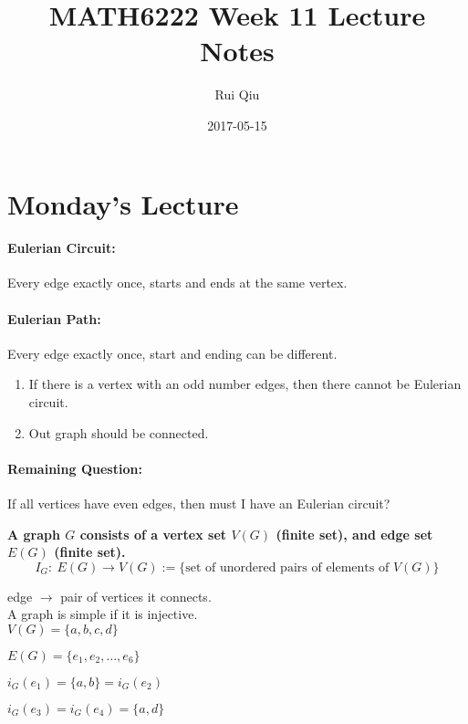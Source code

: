 \documentclass[a4paper, 11pt, twoside]{article}
\begin{document}
\title{MATH6222 Week 11 Lecture Notes}
\author{Rui Qiu}
\date{2017-05-15}

\maketitle

\section{Monday's Lecture}

\paragraph{Eulerian Circuit:} Every edge exactly once, starts and ends at the same vertex.

\paragraph{Eulerian Path:} Every edge exactly once, start and ending can be different.

\begin{enumerate}
	\item If there is a vertex with an odd number edges, then there cannot be Eulerian circuit.
	\item Out graph should be connected.
\end{enumerate}

\paragraph{Remaining Question:} If all vertices have even edges, then must I have an Eulerian circuit?

\textbf{A graph $G$ consists of a vertex set $V(G)$ (finite set), and edge set $E(G)$ (finite set).}\\

\[I_G:\ E(G)\rightarrow V(G):=\{\text{set of unordered pairs of elements of } V(G)\}
\]

edge $\rightarrow$ pair of vertices it connects.\\

A graph is simple if it is injective.\\

$V(G)=\{a,b,c,d\}$

$E(G)=\{e_1,e_2,\dots, e_6\}$

$i_G(e_1)= \{a, b\}=i_G(e_2)$

$i_G(e_3)=i_G(e_4)=\{a, d\}$
\end{document}
